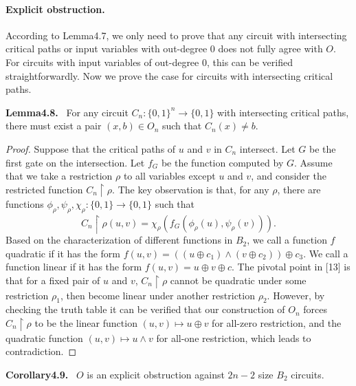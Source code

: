 \documentclass[10pt,a4paper]{article}
\newenvironment{authorclaim}[1]{\par\medskip\noindent\textbf{#1.}\ }{\par\medskip}
\begin{document}
\paragraph{Explicit obstruction.} According to Lemma4.7, we only need to prove that any circuit with intersecting critical paths or input variables with out-degree 0 does not fully agree with $O$. For circuits with input variables of out-degree 0, this can be verified straightforwardly. Now we prove the case for circuits with intersecting critical paths.
\begin{authorclaim}{Lemma4.8}
For any circuit $C_n:\{0,1\}^n\to\{0,1\}$ with intersecting critical paths, there must exist a pair $(x,b)\in O_n$ such that $C_n(x)\ne b$.
\end{authorclaim}
\begin{proof}
Suppose that the critical paths of $u$ and $v$ in $C_n$ intersect. Let $G$ be the first gate on the intersection. Let $f_G$ be the function computed by $G$. Assume that we take a restriction $\rho$ to all variables except $u$ and $v$, and consider the restricted function $C_n\upharpoonright\rho$. The key observation is that, for any $\rho$, there are functions $\phi_\rho,\psi_\rho,\chi_\rho:\{0,1\}\to\{0,1\}$ such that
\[C_n\upharpoonright\rho(u,v)=\chi_\rho(f_G(\phi_\rho(u),\psi_\rho(v))).\]
Based on the characterization of different functions in $B_2$, we call a function $f$ quadratic if it has the form $f(u,v)=((u\oplus c_1)\wedge(v\oplus c_2))\oplus c_3$. We call a function linear if it has the form $f(u,v)=u\oplus v\oplus c$. The pivotal point in [13] is that for a fixed pair of $u$ and $v$, $C_n\upharpoonright\rho$ cannot be quadratic under some restriction $\rho_1$, then become linear under another restriction $\rho_2$. However, by checking the truth table it can be verified that our construction of $O_n$ forces $C_n\upharpoonright\rho$ to be the linear function $(u,v)\mapsto u\oplus v$ for all-zero restriction, and the quadratic function $(u,v)\mapsto u\wedge v$ for all-one restriction, which leads to contradiction.
\end{proof}
\begin{authorclaim}{Corollary4.9}
$O$ is an explicit obstruction against $2n-2$ size $B_2$ circuits.
\end{authorclaim}
\end{document}
